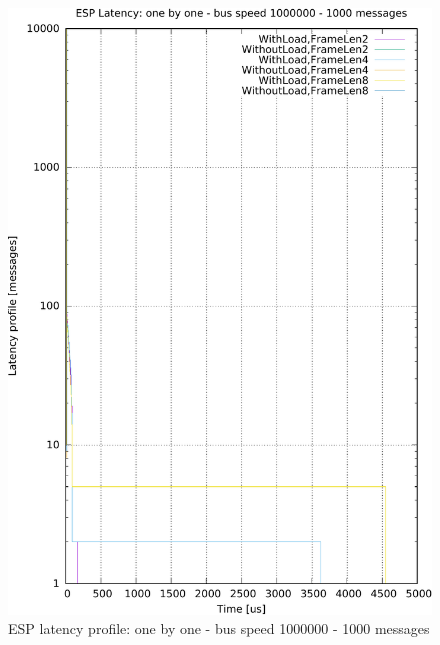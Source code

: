 \documentclass{ctuthesis}
\begin{document}
\begin{figure}[htb]
\includegraphics[width=\linewidth]{figures/speed1000000_messages1000_floodFalse.pdf}
\caption{ESP latency profile: one by one - bus speed 1000000 - 1000 messages}
\end{figure}
\end{document}
